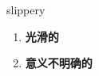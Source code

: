 
\begin{frame}
{\huge slippery}
\begin{center}
\begin{enumerate}\Large
  \item \textbf{光滑的}
  \item \textbf{意义不明确的}
\end{enumerate}
\end{center}
\end{frame}
